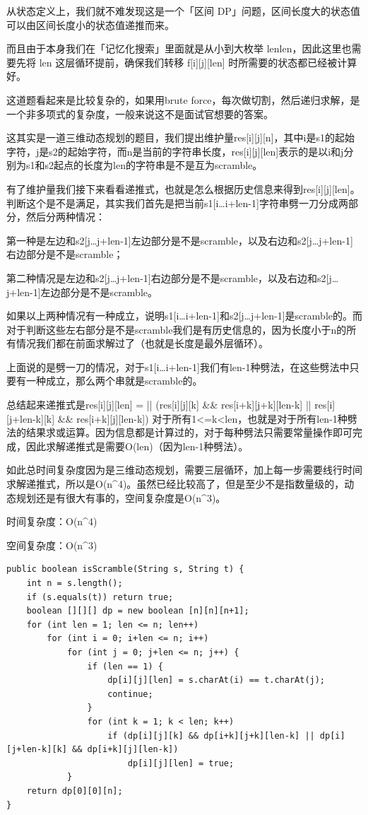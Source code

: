 \documentclass[9pt, b5paaper]{book}
\begin{document}
\begin{enumerate}
从状态定义上，我们就不难发现这是一个「区间 DP」问题，区间长度大的状态值可以由区间长度小的状态值递推而来。

而且由于本身我们在「记忆化搜索」里面就是从小到大枚举 lenlen，因此这里也需要先将 len 这层循环提前，确保我们转移 f[i][j][len] 时所需要的状态都已经被计算好。

这道题看起来是比较复杂的，如果用brute force，每次做切割，然后递归求解，是一个非多项式的复杂度，一般来说这不是面试官想要的答案。

这其实是一道三维动态规划的题目，我们提出维护量res[i][j][n]，其中i是s1的起始字符，j是s2的起始字符，而n是当前的字符串长度，res[i][j][len]表示的是以i和j分别为s1和s2起点的长度为len的字符串是不是互为scramble。

有了维护量我们接下来看看递推式，也就是怎么根据历史信息来得到res[i][j][len]。判断这个是不是满足，其实我们首先是把当前s1[i\ldots{}i+len-1]字符串劈一刀分成两部分，然后分两种情况：

第一种是左边和s2[j\ldots{}j+len-1]左边部分是不是scramble，以及右边和s2[j\ldots{}j+len-1]右边部分是不是scramble；

第二种情况是左边和s2[j\ldots{}j+len-1]右边部分是不是scramble，以及右边和s2[j\ldots{}j+len-1]左边部分是不是scramble。

如果以上两种情况有一种成立，说明s1[i\ldots{}i+len-1]和s2[j\ldots{}j+len-1]是scramble的。而对于判断这些左右部分是不是scramble我们是有历史信息的，因为长度小于n的所有情况我们都在前面求解过了（也就是长度是最外层循环）。

上面说的是劈一刀的情况，对于s1[i\ldots{}i+len-1]我们有len-1种劈法，在这些劈法中只要有一种成立，那么两个串就是scramble的。

总结起来递推式是res[i][j][len] = || (res[i][j][k] \&\& res[i+k][j+k][len-k] || res[i][j+len-k][k] \&\& res[i+k][j][len-k]) 对于所有1<=k<len，也就是对于所有len-1种劈法的结果求或运算。因为信息都是计算过的，对于每种劈法只需要常量操作即可完成，因此求解递推式是需要O(len)（因为len-1种劈法）。

如此总时间复杂度因为是三维动态规划，需要三层循环，加上每一步需要线行时间求解递推式，所以是O(n\^{}4)。虽然已经比较高了，但是至少不是指数量级的，动态规划还是有很大有事的，空间复杂度是O(n\^{}3)。

时间复杂度：O(n\^{}4)

空间复杂度：O(n\^{}3)

\begin{verbatim}
public boolean isScramble(String s, String t) {
    int n = s.length();
    if (s.equals(t)) return true;
    boolean [][][] dp = new boolean [n][n][n+1];
    for (int len = 1; len <= n; len++) 
        for (int i = 0; i+len <= n; i++) 
            for (int j = 0; j+len <= n; j++) {
                if (len == 1) {
                    dp[i][j][len] = s.charAt(i) == t.charAt(j);
                    continue;
                }
                for (int k = 1; k < len; k++) 
                    if (dp[i][j][k] && dp[i+k][j+k][len-k] || dp[i][j+len-k][k] && dp[i+k][j][len-k])
                        dp[i][j][len] = true;
            }
    return dp[0][0][n];
}
\end{verbatim}
\end{enumerate}
\end{document}
